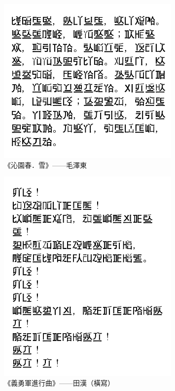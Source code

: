 \documentclass[a5paper, 12pt, openany]{book} %
\begin{document}

\begin{figure}[H]
  \centering
  \includegraphics[width=0.8\textwidth]{./images/biaoyinzi_3.png}
  \caption{《沁園春．雪》——毛澤東}
  \label{fig:biaoyinzi_3}
\end{figure}




\begin{figure}[H]
  \centering
  \includegraphics[width=0.8\textwidth]{./images/biaoyinzi_4.png}
  \caption{《義勇軍進行曲》——田漢（橫寫）}
  \label{fig:biaoyinzi_4}
\end{figure}
\end{document}
